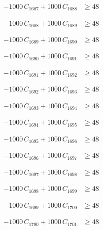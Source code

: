 \documentclass[a4paper,11pt]{article}
\begin{document}
\begin{align}
-1000\,C_{1687} + 1000\,C_{1688} &\geq 48 \nonumber
\end{align}

\begin{align}
-1000\,C_{1688} + 1000\,C_{1689} &\geq 48 \nonumber
\end{align}

\begin{align}
-1000\,C_{1689} + 1000\,C_{1690} &\geq 48 \nonumber
\end{align}

\begin{align}
-1000\,C_{1690} + 1000\,C_{1691} &\geq 48 \nonumber
\end{align}

\begin{align}
-1000\,C_{1691} + 1000\,C_{1692} &\geq 48 \nonumber
\end{align}

\begin{align}
-1000\,C_{1692} + 1000\,C_{1693} &\geq 48 \nonumber
\end{align}

\begin{align}
-1000\,C_{1693} + 1000\,C_{1694} &\geq 48 \nonumber
\end{align}

\begin{align}
-1000\,C_{1694} + 1000\,C_{1695} &\geq 48 \nonumber
\end{align}

\begin{align}
-1000\,C_{1695} + 1000\,C_{1696} &\geq 48 \nonumber
\end{align}

\begin{align}
-1000\,C_{1696} + 1000\,C_{1697} &\geq 48 \nonumber
\end{align}

\begin{align}
-1000\,C_{1697} + 1000\,C_{1698} &\geq 48 \nonumber
\end{align}

\begin{align}
-1000\,C_{1698} + 1000\,C_{1699} &\geq 48 \nonumber
\end{align}

\begin{align}
-1000\,C_{1699} + 1000\,C_{1700} &\geq 48 \nonumber
\end{align}

\begin{align}
-1000\,C_{1700} + 1000\,C_{1701} &\geq 48 \nonumber
\end{align}
\end{document}
